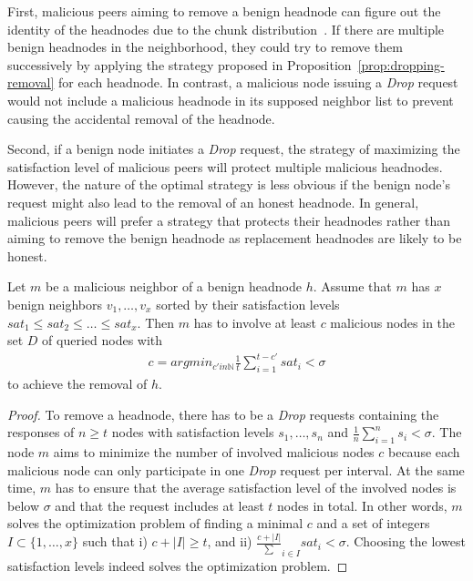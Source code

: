 First, malicious peers aiming to remove a benign headnode can figure out the identity of the headnodes due to the chunk distribution~\cite{nguyen2016swap}. If there are multiple benign headnodes in the neighborhood, they could try to remove them successively by applying the strategy proposed in Proposition~\ref{prop:dropping-removal} for each headnode. In contrast, a malicious node issuing a \textit{Drop} request would not include a malicious headnode in its supposed neighbor list to prevent causing the accidental removal of the headnode. 
   
Second, if a benign node initiates a \textit{Drop} request, the strategy of maximizing the satisfaction level of malicious peers will protect multiple malicious headnodes. However, the nature of the optimal strategy is less obvious if the benign node's request might also lead to the removal of an honest headnode. In general, malicious peers will prefer a strategy that protects their headnodes rather than aiming to remove the benign headnode as replacement headnodes are likely to be honest.  

\begin{proposition}
\label{prop:dropping-removal}
Let $m$ be a malicious neighbor of a benign headnode $h$. Assume that $m$ has $x$ benign neighbors $v_1, \ldots , v_x$ sorted by their satisfaction levels $sat_1 \leq sat_2 \leq \ldots  \leq sat_x$. 
Then $m$ has to involve at least $c$ malicious nodes in the set $D$ of queried nodes with 
\begin{align}
\label{eq:drop-rem}
c = argmin_{c' in \mathbb{N}} \frac{1}{t}\sum_{i=1}^{t-c'}sat_i < \sigma
\end{align}
to achieve the removal of $h$. 
\end{proposition}
\begin{proof}
To remove a headnode, there has to be a \textit{Drop} requests containing the responses of $n\geq t$ nodes with satisfaction levels $s_1, \ldots , s_n$ and 
$\frac{1}{n}\sum_{i=1}^{n}s_i < \sigma$.
The node $m$ aims to minimize the number of involved malicious nodes $c$ because each malicious node can only participate in one \textit{Drop} request per interval. At the same time, $m$ has to ensure that the average satisfaction level of the involved nodes is below $\sigma$ and that the request includes at least $t$ nodes in total.
In other words, $m$ solves the optimization problem of finding a minimal $c$ and a set of integers $I \subset \{1, \ldots, x\}$ such that i) $c + |I| \geq t$, and ii) $\frac{c + |I|} \sum_{i \in I} sat_i < \sigma$. 
Choosing the lowest satisfaction levels indeed solves the optimization problem. 
\end{proof}

